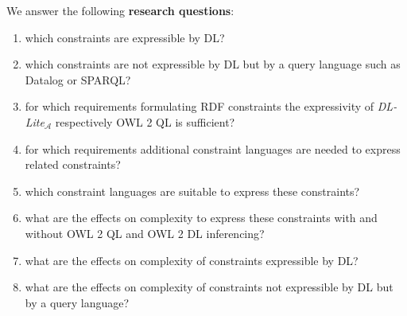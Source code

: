 \documentclass{llncs}
\begin{document}

%
%

We answer the following \textbf{research questions}:
\begin{enumerate}
	\item which constraints are expressible by DL?
	\item which constraints are not expressible by DL but by a query language such as Datalog or SPARQL?
	\item for which requirements formulating RDF constraints the expressivity of \textit{DL-Lite}$_\mathcal{A}$ respectively OWL 2 QL is sufficient?
	\item for which requirements additional constraint languages are needed to express related constraints?
	\item which constraint languages are suitable to express these constraints?
	\item what are the effects on complexity to express these constraints with and without OWL 2 QL and OWL 2 DL inferencing?
	\item what are the effects on complexity of constraints expressible by DL?
	\item what are the effects on complexity of constraints not expressible by DL but by a query language?
\end{enumerate}
\end{document}
